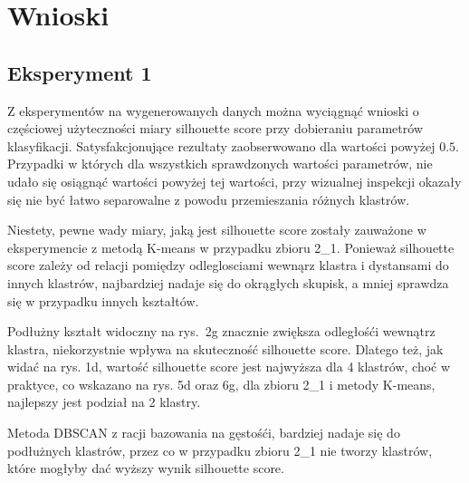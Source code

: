 \documentclass[12pt]{article}
\begin{document}
\section{Wnioski}

\subsection*{Eksperyment 1}

Z eksperymentów na wygenerowanych danych można wyciągnąć wnioski o częściowej użyteczności miary silhouette score przy dobieraniu parametrów klasyfikacji.
Satysfakcjonujące rezultaty zaobserwowano dla wartości powyżej $0.5$.
Przypadki w których dla wszystkich sprawdzonych wartości parametrów, nie udało się osiągnąć wartości powyżej tej wartości, 
przy wizualnej inspekcji okazały się nie być łatwo separowalne z powodu przemieszania różnych klastrów.

Niestety, pewne wady miary, jaką jest silhouette score zostały zauważone w eksperymencie z metodą K-means w przypadku zbioru 2\_1.
Ponieważ silhouette score zależy od relacji pomiędzy odleglosciami wewnąrz klastra i dystansami do innych klastrów, najbardziej nadaje się do okrągłych skupisk, a mniej sprawdza się w przypadku innych kształtów.

Podłużny kształt widoczny na rys.~2g znacznie zwiększa odległośći wewnątrz klastra, niekorzystnie wpływa na skuteczność silhouette score. 
Dlatego też, jak widać na rys. 1d, wartość silhouette score jest najwyższa dla 4 klastrów, 
choć w praktyce, co wskazano na rys. 5d oraz 6g, dla zbioru 2\_1 i metody K-means, najlepszy jest podział na 2 klastry.

Metoda DBSCAN z racji bazowania na gęstośći, bardziej nadaje się do podłużnych klastrów, przez co w przypadku zbioru 2\_1 nie tworzy klastrów, które mogłyby dać wyższy wynik silhouette score.
\end{document}
